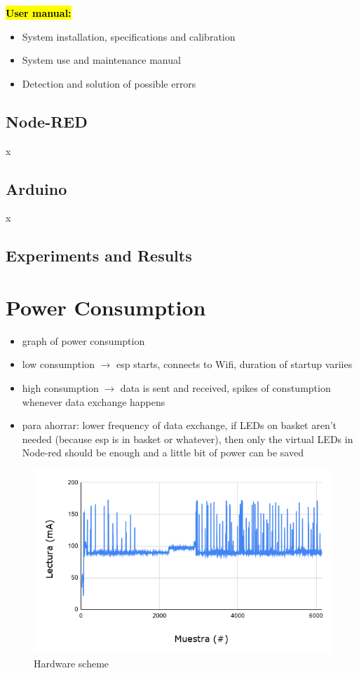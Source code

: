\documentclass{article}
\begin{document}
\textcolor{red}{\textbf{\hl{User manual:}}}
\begin{itemize}
	\item System installation, specifications and calibration
	\item System use and maintenance manual
	\item Detection and solution of possible errors
\end{itemize}

\subsection{Node-RED}
x

\subsection{Arduino}
x

\subsection{Experiments and Results}
\section{Power Consumption}
\begin{itemize}
\item graph of power consumption
\item low consumption $\to$ esp starts, connects to Wifi, duration of startup variies
\item high consumption $\to$ data is sent and received, spikes of constumption whenever data exchange happens
\item para ahorrar: lower frequency of data exchange, if LEDs on basket aren't needed (because esp is in basket or whatever), then only the virtual LEDs in Node-red should be enough and a little bit of power can be saved
\end{itemize}

\begin{figure}[]
	\centering
	\includegraphics[scale=0.5]{images/chart.png}
	\caption{Hardware scheme}	
	\label{chart_power}
\end{figure}
\end{document}
